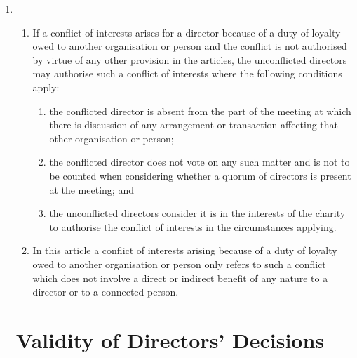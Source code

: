 \begin{enumerate}
\item 
  \begin{enumerate}
  \item
    If a conflict of interests arises for a director because of a duty
    of loyalty owed to another organisation or person and the conflict
    is not authorised by virtue of any other provision in the articles,
    the unconflicted directors may authorise such a conflict of
    interests where the following conditions apply:
    \begin{enumerate}
    \item
      the conflicted director is absent from the part of the meeting at
      which there is discussion of any arrangement or transaction
      affecting that other organisation or person;
    \item
      the conflicted director does not vote on any such matter and is not
      to be counted when considering whether a quorum of directors is
      present at the meeting; and
    \item
      the unconflicted directors consider it is in the interests of the
      charity to authorise the conflict of interests in the circumstances
      applying.
    \end{enumerate}
  \item \label{conflict-interest-loyalty}
    In this article a conflict of interests arising because of a duty
    of loyalty owed to another organisation or person only refers to
    such a conflict which does not involve a direct or indirect benefit
    of any nature to a director or to a connected person.
  \end{enumerate}

\section{Validity of Directors' Decisions}


\end{enumerate}
